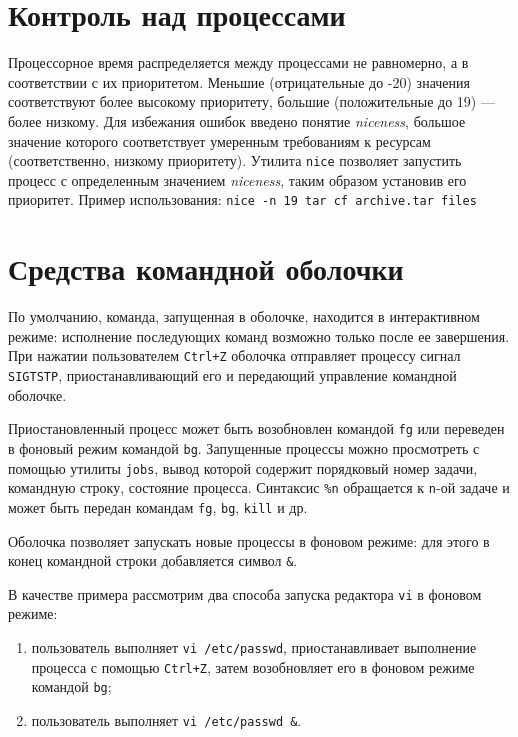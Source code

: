 \documentclass[listings]{labreport}
\begin{document}
\maketitlepage

\section*{Контроль над процессами}

Процессорное время распределяется между процессами не равномерно, а в соответствии с их приоритетом.
Меньшие (отрицательные до -20) значения соответствуют более высокому приоритету, большие (положительные до 19) — более низкому.
Для избежания ошибок введено понятие \textit{niceness}, большое значение которого соответствует умеренным требованиям к ресурсам
(соответственно, низкому приоритету).
Утилита \texttt{nice} позволяет запустить процесс с определенным значением \textit{niceness}, таким образом установив его приоритет.
Пример использования: \texttt{nice -n 19 tar cf archive.tar files}

\section*{Средства командной оболочки}

По умолчанию, команда, запущенная в оболочке, находится в интерактивном режиме: исполнение последующих команд возможно только после ее завершения.
При нажатии пользователем \texttt{Ctrl+Z} оболочка отправляет процессу сигнал \texttt{SIGTSTP}, приостанавливающий его и 
передающий управление командной оболочке.

Приостановленный процесс может быть возобновлен командой \texttt{fg} или переведен в фоновый режим командой \texttt{bg}. Запущенные
процессы можно просмотреть с помощью утилиты \texttt{jobs}, вывод которой содержит порядковый номер задачи, командную строку, состояние процесса.
Синтаксис \texttt{\%n} обращается к \texttt{n}-ой задаче и может быть передан командам \texttt{fg}, \texttt{bg}, \texttt{kill} и др.

Оболочка позволяет запускать новые процессы в фоновом режиме: для этого в конец командной строки добавляется символ \texttt{\&}.

В качестве примера рассмотрим два способа запуска редактора \texttt{vi} в фоновом режиме:
\begin{enumerate}
\item пользователь выполняет \texttt{vi /etc/passwd}, приостанавливает выполнение процесса с помощью \texttt{Ctrl+Z},
затем возобновляет его в фоновом режиме командой \texttt{bg};
\item пользователь выполняет \texttt{vi /etc/passwd \&}.
\end{enumerate}
\end{document}
